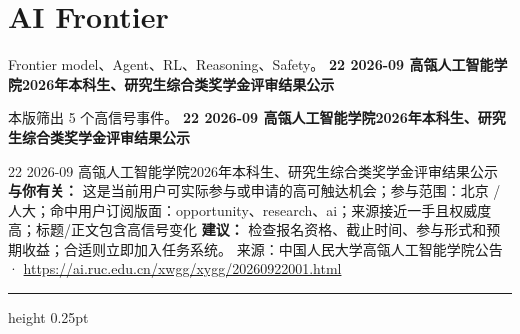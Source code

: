 \documentclass[10.5pt]{ctexart}
\begin{document}
\section*{AI Frontier}
{\color{ormuted} Frontier model、Agent、RL、Reasoning、Safety。}
\vspace{2mm}
{\LARGE\bfseries 22 2026-09 高瓴人工智能学院2026年本科生、研究生综合类奖学金评审结果公示}\par
\vspace{1mm}
{\color{ormuted} 本版筛出 5 个高信号事件。}
\vspace{3mm}
{\Large\bfseries 22 2026-09 高瓴人工智能学院2026年本科生、研究生综合类奖学金评审结果公示}\par
22 2026-09 高瓴人工智能学院2026年本科生、研究生综合类奖学金评审结果公示
\textbf{与你有关：} 这是当前用户可实际参与或申请的高可触达机会；参与范围：北京 / 人大；命中用户订阅版面：opportunity、research、ai；来源接近一手且权威度高；标题/正文包含高信号变化
\textbf{建议：} 检查报名资格、截止时间、参与形式和预期收益；合适则立即加入任务系统。
{\footnotesize\color{ormuted} 来源：中国人民大学高瓴人工智能学院公告 · \url{https://ai.ruc.edu.cn/xwgg/xygg/20260922001.html}}
\vspace{4mm}
\hrule height 0.25pt
\vspace{3mm}
\end{document}
